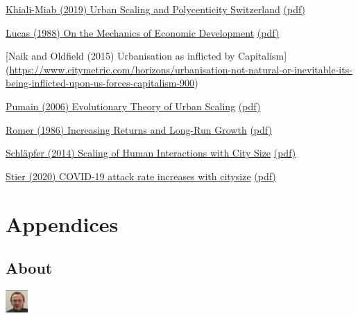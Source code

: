 \documentclass[
]{book}
\begin{document}
\href{https://journals.plos.org/plosone/article?id=10.1371/journal.pone.0218022\#sec016}{Khiali-Miab (2019) Urban Scaling and Polycenticity Switzerland}
\href{Khiali-Miab_2019_Urban_Scaling_Polycentric_Switzerland.pdf}{(pdf)}

\href{https://www.sciencedirect.com/science/article/abs/pii/030\%204393288901687}{Lucas (1988) On the Mechanics of Economic Development}
\href{/Robert_lucas_1988_On_The_Mechanics_of_Economic_Develøopment.pdf}{(pdf)}

{[}Naik and Oldfield (2015) Urbanisation as inflicted by Capitalism{]} (\url{https://www.citymetric.com/horizons/urbanisation-not-natural-or-inevitable-its-being-inflicted-upon-us-forces-capitalism-900})

\href{https://journals.openedition.org/cybergeo/2519}{Pumain (2006) Evolutionary Theory of Urban Scaling}
\href{/Pumain_2006_Evolutionary_Theory_of_Urban_Scaling.pdf}{(pdf)}

\href{https://www.semanticscholar.org/paper/Increasing-Returns-an\%20d-Long-Run-Growth-Romer/b64575b655cf78cb97afa12eab1001a4a3959117}{Romer (1986) Increasing Returns and Long-Run Growth}
\href{/Paul_Romer_1986_Increasing_Returns_and_Long_Run_Growth.pdf}{(pdf)}

\href{https://royalsocietypublishing.org/doi/full/10.10\%2098/rsif.2013.0789}{Schläpfer (2014) Scaling of Human Interactions with City Size}
\href{/Schlapfer_2014_Scaling_Interactions_City_Size.pdf}{(pdf)}

\href{https://arxiv.org/abs/2003.10376}{Stier (2020) COVID-19 attack rate increases with citysize}
\href{/Stier_2020_COVID-19_Attcak_Rate_City_SIze.pdf}{(pdf)}

\hypertarget{part-appendices}{%
\part{Appendices}\label{part-appendices}}

\hypertarget{appendix-appendices}{%
\appendix}


\hypertarget{about}{%
\chapter{About}\label{about}}

\includegraphics{fig/me.jpg}
\end{document}
